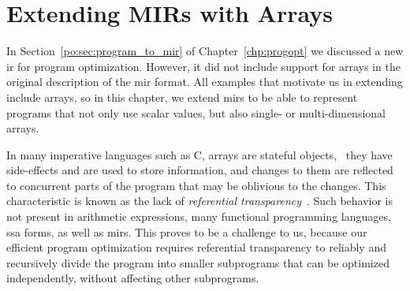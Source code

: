 \section{Extending MIRs with Arrays}
\label{lo:sec:intermediate}


In Section~\ref{po:sec:program_to_mir} of Chapter~\ref{chp:progopt} we
discussed a new \gls{ir} for program optimization.  However, it did not include
support for arrays in the original description of the \gls{mir} format.  All
examples that motivate us in extending \soap{} include arrays, so in this
chapter, we extend \glspl{mir} to be able to represent programs that not only
use scalar values, but also single- or multi-dimensional arrays.

In many imperative languages such as C, arrays are stateful objects, \ie~they
have side-effects and are used to store information, and changes to them
are reflected to concurrent parts of the program that may be oblivious to
the changes.  This characteristic is known as the lack of \emph{referential
transparency}~\cite{sondergaard90}.  Such behavior is not present in arithmetic
expressions, many functional programming languages, \gls{ssa} forms, as well
as \glspl{mir}.  This proves to be a challenge to us, because our efficient
program optimization requires referential transparency to reliably and
recursively divide the program into smaller subprograms that can be optimized
independently, without affecting other subprograms.

